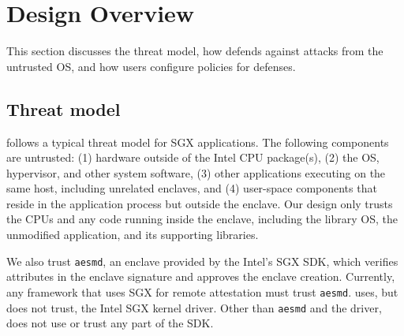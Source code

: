 \section{Design Overview}
\label{sec:sgx:overview}

This section discusses the threat model,
how \graphenesgx{} defends against attacks from the untrusted OS,
and how users configure policies for defenses.


\subsection{Threat model}
\label{sec:sgx:overview:threat}

\graphenesgx{} follows a typical threat model for SGX applications.
The following components are untrusted:
(1) hardware outside of the Intel CPU package(s),
(2) the OS, hypervisor, and other system software,
(3) other applications executing on the same host, including unrelated enclaves,
and (4) user-space components that
reside in the application process but outside the enclave.
Our design only trusts the CPUs and any code running inside the enclave, including the library OS, the unmodified application, and its supporting libraries. 

We also trust {\tt aesmd}, an enclave provided by the Intel's SGX SDK, which verifies
attributes in the enclave signature and approves the enclave creation.
Currently, any framework that uses SGX for remote attestation must trust {\tt aesmd}.
\graphenesgx{} uses, but does not trust, the Intel SGX kernel driver.
Other than {\tt aesmd} and the driver, \graphenesgx{} does not use or trust any part of the SDK.

